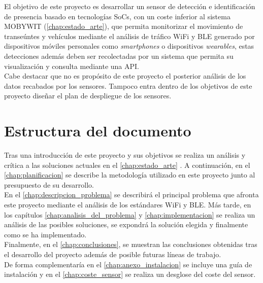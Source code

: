 \documentclass[../proyecto.tex]{subfiles}
\begin{document}
El objetivo de este proyecto es desarrollar un sensor de detección e identificación de presencia basado en tecnologías SoCs, con un coste inferior al sistema MOBYWIT (\autoref{chap:estado_arte}), que permita monitorizar el movimiento de transeúntes y vehículos mediante el análisis de tráfico WiFi y BLE generado por dispositivos móviles personales como \textit{smartphones} o dispositivos \textit{wearables}, estas detecciones además deben ser recolectadas por un sistema que permita su visualización y consulta mediante una API.\\

Cabe destacar que no es propósito de este proyecto el posterior análisis de los datos recabados por los sensores. Tampoco entra dentro de los objetivos de este proyecto diseñar el plan de despliegue de los sensores.\\

\section{Estructura del documento}

 Tras una introducción de este proyecto y sus objetivos se realiza un análisis y crítica a las soluciones actuales en el \autoref{chap:estado_arte} . A continuación, en el \autoref{chap:planificacion} se describe la metodología utilizado en este proyecto junto al presupuesto de su desarrollo.\\

En el \autoref{chap:descripcion_problema} se describirá el principal problema que afronta este proyecto mediante el análisis de los estándares WiFi y BLE. Más tarde, en los capítulos \autoref{chap:analisis_del_problema} y \autoref{chap:implementacion} se realiza un análisis de las posibles soluciones, se expondrá la solución elegida y finalmente como se ha implementado.\\

Finalmente, en el \autoref{chap:conclusiones}, se muestran las conclusiones obtenidas tras el desarrollo del proyecto además de posible futuras líneas de trabajo.\\

De forma complementaría en el  \autoref{chap:anexo_instalacion} se incluye una guía de instalación y en el \autoref{chap:coste_sensor} se realiza un desglose del coste del sensor.\\
\end{document}
